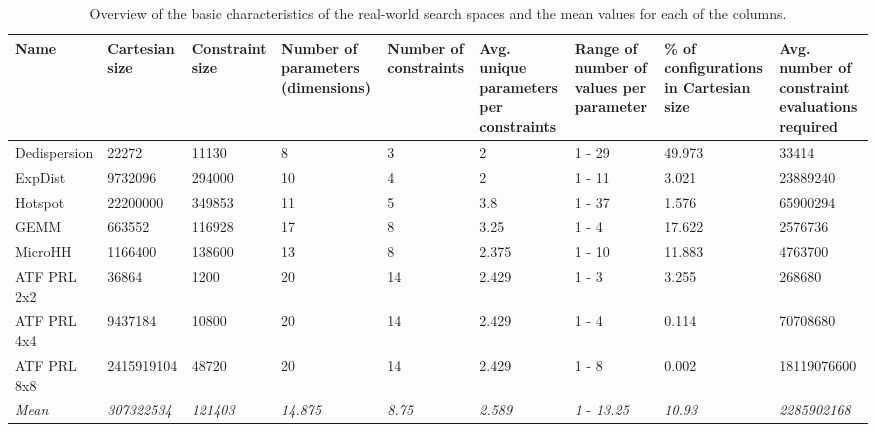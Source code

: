 \begin{table}[htb]
\begin{tabularx}{\linewidth}{|l|X|X|X|X|X|X|X|X|}
        \textbf{Name} & \textbf{Cartesian size} & \textbf{Constraint size} & \textbf{Number of parameters (dimensions)} & \textbf{Number of constraints} & \textbf{Avg. unique parameters per constraints} & \textbf{Range of number of values per parameter} & \textbf{\% of configurations in Cartesian size} & \textbf{Avg. number of constraint evaluations required}  \\
        \hline
        Dedispersion & 22272 & 11130    & 8 & 3     & 2 & 1 - 29 & 49.973     & 33414 \\\hline
        ExpDist & 9732096 & 294000      & 10 & 4    & 2 & 1 - 11 & 3.021      & 23889240 \\\hline
        Hotspot & 22200000 & 349853     & 11 & 5    & 3.8 & 1 - 37 & 1.576    & 65900294 \\\hline
        GEMM & 663552 & 116928          & 17 & 8    & 3.25 & 1 - 4 & 17.622   & 2576736 \\\hline
        MicroHH & 1166400 & 138600      & 13 & 8    & 2.375 & 1 - 10 & 11.883 & 4763700 \\\hline
        ATF PRL 2x2 & 36864 & 1200      & 20 & 14   & 2.429 & 1 - 3 & 3.255   & 268680 \\\hline
        ATF PRL 4x4 & 9437184 & 10800   & 20 & 14   & 2.429 & 1 - 4 & 0.114   & 70708680 \\\hline
        ATF PRL 8x8 & 2415919104 & 48720 & 20 & 14  & 2.429 & 1 - 8 & 0.002   & 18119076600 \\\hline
        \hline
        \textit{Mean} & \textit{307322534} & \textit{121403} & \textit{14.875} & \textit{8.75}  & \textit{2.589} & \textit{1} - \textit{13.25} & \textit{10.93} & \textit{2285902168} \\\hline
    \end{tabularx}
    \caption{Overview of the basic characteristics of the real-world search spaces and the mean values for each of the columns.}
    \label{tab:searchspaces_real_world_overview}
\end{table}

